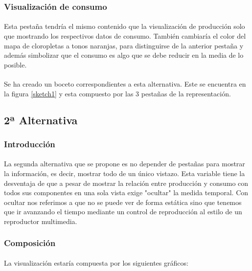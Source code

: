 \documentclass{article}
\begin{document}
			\subsubsection{Visualización de consumo}

				\paragraph{}
				Esta pestaña tendría el mismo contenido que la visualización de producción solo que mostrando los respectivos datos de consumo. También cambiaría el color del mapa de cloropletas a tonos naranjas, para distinguirse de la anterior pestaña y además simbolizar que el consumo es algo que se debe reducir en la media de lo posible.
				
			\paragraph{}
			Se ha creado un boceto correspondientes a esta alternativa. Este se encuentra en la figura \ref{sketch1} y esta compuesto por las 3 pestañas de la representación.
				
		\subsection{2ª Alternativa}
		
			\subsubsection{Introducción}
				
				\paragraph{}
				La segunda alternativa que se propone es no depender de pestañas para mostrar la información, es decir, mostrar todo de un único vistazo. Esta variable tiene la desventaja de que a pesar de mostrar la relación entre producción y consumo con todos sus componentes en una sola vista exige "ocultar" la medida temporal. Con ocultar nos referimos a que no se puede ver de forma estática sino que tenemos que ir avanzando el tiempo mediante un control de reproducción al estilo de un reproductor multimedia.
			
			\subsubsection{Composición}
				\paragraph{}
				La visualización estaría compuesta por los siguientes gráficos:
				
\end{document}
